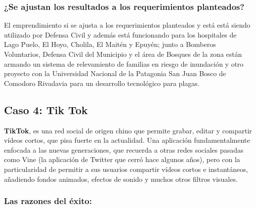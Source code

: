 \documentclass[titlepage,a4paper,twoside]{article}
\begin{document}
    
    \subsubsection{¿Se ajustan los resultados a los requerimientos planteados?}
    
    El emprendimiento si se ajusta a los requerimientos planteados y está está siendo utilizado por Defensa Civil y además está funcionando para los hospitales de Lago Puelo, El Hoyo, Cholila, El Maitén y Epuyén; junto a Bomberos Voluntarios, Defensa Civil del Municipio y el área de Bosques de la zona están armando un sistema de relevamiento de familias en riesgo de inundación y otro proyecto con la Universidad Nacional de la Patagonia San Juan Bosco de Comodoro Rivadavia para un desarrollo tecnológico para plagas.
    
    
    \subsection{Caso 4: Tik Tok}
    
    
    \textbf{TikTok}, es una red social de origen chino que permite grabar, editar y compartir vídeos cortos, que pisa fuerte en la actualidad. Una aplicación fundamentalmente enfocada a las nuevas generaciones, que recuerda a otras redes sociales pasadas como Vine (la aplicación de Twitter que cerró hace algunos años), pero con la particularidad de permitir a sus usuarios compartir vídeos cortos e instantáneos, añadiendo fondos animados, efectos de sonido y muchos otros filtros visuales.
    
    
    \subsubsection{Las razones del éxito:}
    
\end{document}
